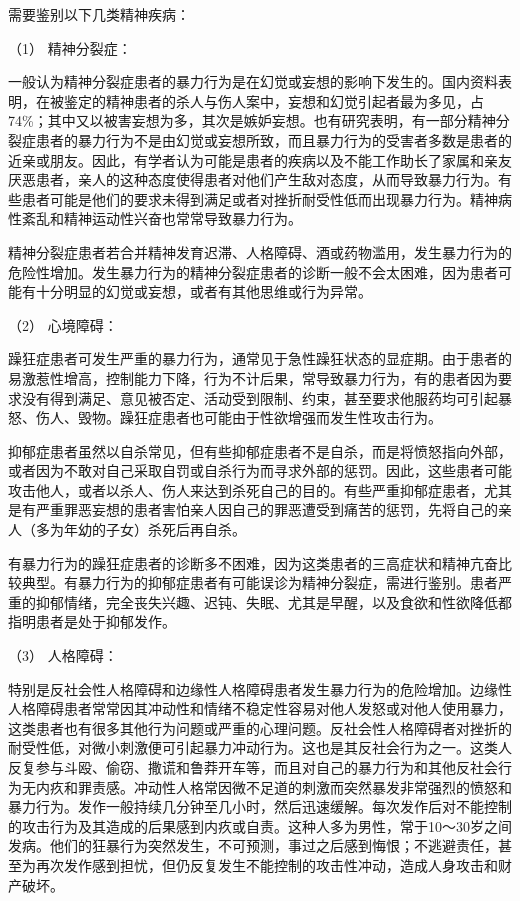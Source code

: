 需要鉴别以下几类精神疾病：

\hypertarget{text00054.htmlux5cux23CHP1-18-12-2-1-1}{}
（1） 精神分裂症：

一般认为精神分裂症患者的暴力行为是在幻觉或妄想的影响下发生的。国内资料表明，在被鉴定的精神患者的杀人与伤人案中，妄想和幻觉引起者最为多见，占74\%；其中又以被害妄想为多，其次是嫉妒妄想。也有研究表明，有一部分精神分裂症患者的暴力行为不是由幻觉或妄想所致，而且暴力行为的受害者多数是患者的近亲或朋友。因此，有学者认为可能是患者的疾病以及不能工作助长了家属和亲友厌恶患者，亲人的这种态度使得患者对他们产生敌对态度，从而导致暴力行为。有些患者可能是他们的要求未得到满足或者对挫折耐受性低而出现暴力行为。精神病性紊乱和精神运动性兴奋也常常导致暴力行为。

精神分裂症患者若合并精神发育迟滞、人格障碍、酒或药物滥用，发生暴力行为的危险性增加。发生暴力行为的精神分裂症患者的诊断一般不会太困难，因为患者可能有十分明显的幻觉或妄想，或者有其他思维或行为异常。

\hypertarget{text00054.htmlux5cux23CHP1-18-12-2-1-2}{}
（2） 心境障碍：

躁狂症患者可发生严重的暴力行为，通常见于急性躁狂状态的显症期。由于患者的易激惹性增高，控制能力下降，行为不计后果，常导致暴力行为，有的患者因为要求没有得到满足、意见被否定、活动受到限制、约束，甚至要求他服药均可引起暴怒、伤人、毁物。躁狂症患者也可能由于性欲增强而发生性攻击行为。

抑郁症患者虽然以自杀常见，但有些抑郁症患者不是自杀，而是将愤怒指向外部，或者因为不敢对自己采取自罚或自杀行为而寻求外部的惩罚。因此，这些患者可能攻击他人，或者以杀人、伤人来达到杀死自己的目的。有些严重抑郁症患者，尤其是有严重罪恶妄想的患者害怕亲人因自己的罪恶遭受到痛苦的惩罚，先将自己的亲人（多为年幼的子女）杀死后再自杀。

有暴力行为的躁狂症患者的诊断多不困难，因为这类患者的三高症状和精神亢奋比较典型。有暴力行为的抑郁症患者有可能误诊为精神分裂症，需进行鉴别。患者严重的抑郁情绪，完全丧失兴趣、迟钝、失眠、尤其是早醒，以及食欲和性欲降低都指明患者是处于抑郁发作。

\hypertarget{text00054.htmlux5cux23CHP1-18-12-2-1-3}{}
（3） 人格障碍：

特别是反社会性人格障碍和边缘性人格障碍患者发生暴力行为的危险增加。边缘性人格障碍患者常常因其冲动性和情绪不稳定性容易对他人发怒或对他人使用暴力，这类患者也有很多其他行为问题或严重的心理问题。反社会性人格障碍者对挫折的耐受性低，对微小刺激便可引起暴力冲动行为。这也是其反社会行为之一。这类人反复参与斗殴、偷窃、撒谎和鲁莽开车等，而且对自己的暴力行为和其他反社会行为无内疚和罪责感。冲动性人格常因微不足道的刺激而突然暴发非常强烈的愤怒和暴力行为。发作一般持续几分钟至几小时，然后迅速缓解。每次发作后对不能控制的攻击行为及其造成的后果感到内疚或自责。这种人多为男性，常于10～30岁之间发病。他们的狂暴行为突然发生，不可预测，事过之后感到悔恨；不逃避责任，甚至为再次发作感到担忧，但仍反复发生不能控制的攻击性冲动，造成人身攻击和财产破坏。

